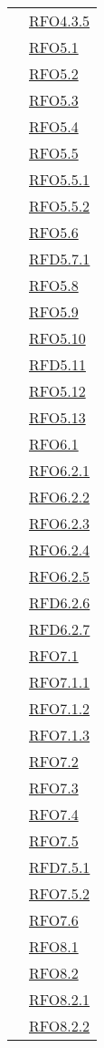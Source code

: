 \begin{longtable}{|>{\centering}m{5cm}|m{5cm}<{\centering}|}
& \hyperlink{RFO4.3.5}{RFO4.3.5}\\
& \hyperlink{RFO5.1}{RFO5.1}\\
& \hyperlink{RFO5.2}{RFO5.2}\\
& \hyperlink{RFO5.3}{RFO5.3}\\
& \hyperlink{RFO5.4}{RFO5.4}\\
& \hyperlink{RFO5.5}{RFO5.5}\\
& \hyperlink{RFO5.5.1}{RFO5.5.1}\\
& \hyperlink{RFO5.5.2}{RFO5.5.2}\\
& \hyperlink{RFO5.6}{RFO5.6}\\
& \hyperlink{RFD5.7.1}{RFD5.7.1}\\
& \hyperlink{RFO5.8}{RFO5.8}\\
& \hyperlink{RFO5.9}{RFO5.9}\\
& \hyperlink{RFO5.10}{RFO5.10}\\
& \hyperlink{RFD5.11}{RFD5.11}\\
& \hyperlink{RFO5.12}{RFO5.12}\\
& \hyperlink{RFO5.13}{RFO5.13}\\
& \hyperlink{RFO6.1}{RFO6.1}\\
& \hyperlink{RFO6.2.1}{RFO6.2.1}\\
& \hyperlink{RFO6.2.2}{RFO6.2.2}\\
& \hyperlink{RFO6.2.3}{RFO6.2.3}\\
& \hyperlink{RFO6.2.4}{RFO6.2.4}\\
& \hyperlink{RFO6.2.5}{RFO6.2.5}\\
& \hyperlink{RFD6.2.6}{RFD6.2.6}\\
& \hyperlink{RFD6.2.7}{RFD6.2.7}\\
& \hyperlink{RFO7.1}{RFO7.1}\\
& \hyperlink{RFO7.1.1}{RFO7.1.1}\\
& \hyperlink{RFO7.1.2}{RFO7.1.2}\\
& \hyperlink{RFO7.1.3}{RFO7.1.3}\\
& \hyperlink{RFO7.2}{RFO7.2}\\
& \hyperlink{RFO7.3}{RFO7.3}\\
& \hyperlink{RFO7.4}{RFO7.4}\\
& \hyperlink{RFO7.5}{RFO7.5}\\
& \hyperlink{RFD7.5.1}{RFD7.5.1}\\
& \hyperlink{RFO7.5.2}{RFO7.5.2}\\
& \hyperlink{RFO7.6}{RFO7.6}\\
& \hyperlink{RFO8.1}{RFO8.1}\\
& \hyperlink{RFO8.2}{RFO8.2}\\
& \hyperlink{RFO8.2.1}{RFO8.2.1}\\
& \hyperlink{RFO8.2.2}{RFO8.2.2}\\


\end{longtable}
